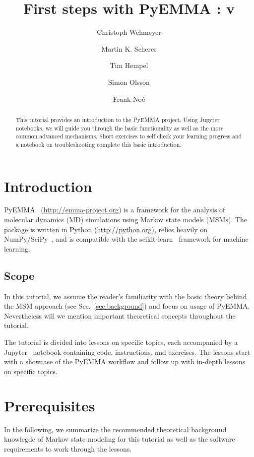 \documentclass[9pt,tutorial]{livecoms}
\title{First steps with PyEMMA : v\versionnumber}
\author[1\authfn{1}*]{Christoph Wehmeyer}
\author[1\authfn{1}*]{Martin K. Scherer}
\author[1*]{Tim Hempel}
\author[1*]{Simon Olsson}
\author[1*]{Frank Noé}
\affil[1]{Department of Mathematics and Computer Science, Freie Universität Berlin, Arnimallee 6, 14195 Berlin, Germany}
\begin{document}
\begin{frontmatter}
\maketitle

\begin{abstract}
This tutorial provides an introduction to the PyEMMA project. Using Jupyter notebooks, we will guide you through the basic functionality as well as the more common advanced mechanisms. Short exercises to self check your learning progress and a notebook on troubleshooting complete this basic introduction.
\end{abstract}

\end{frontmatter}

\section{Introduction}

PyEMMA~\cite{pyemma} (\url{http://emma-project.org}) is a framework for the analysis of molecular dynamics (MD) simulations using Markov state models\cite{schuette-msm,singhal-msm-naming} (MSMs). The package is written in Python (\url{http://python.org}), relies heavily on NumPy/SciPy~\cite{numpy,scipy}, and is compatible with the scikit-learn~\cite{sklearn} framework for machine learning.

\subsection{Scope}

In this tutorial, we assume the reader's familiarity with the basic theory behind the MSM approach (see Sec.~\ref{sec:background}) and focus on usage of PyEMMA. Nevertheless will we mention important theoretical concepts throughout the tutorial.

The tutorial is divided into lessons on specific topics, each accompanied by a Jupyter~\cite{jupyter} notebook containing code, instructions, and exercises. The lessons start with a showcase of the PyEMMA workflow and follow up with in-depth lessons on specific topics.

\section{Prerequisites}

In the following, we summarize the recommended theoretical background knowlegde of Markov state modeling for this tutorial as well as the software requirements to work through the lessons.
\end{document}
